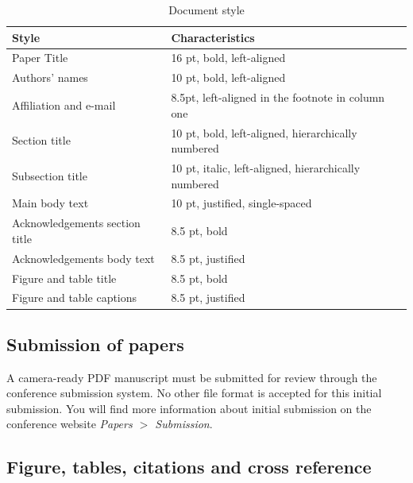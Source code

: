 \documentclass[smallextended,twocolumn]{electrimacs2024}
\begin{document}
\begin{table}[!ht]
	\centering
	\caption{Document style} \label{TAB:sizeandstyle}
	\begin{tabular}{p{1.3in} p{1.3in}} 	\hline\hline
	\textbf{Style}                      & \textbf{Characteristics}         \\ \hline\hline
	Paper Title                         & 16 pt, bold, left-aligned\\ \hline
	Authors' names                      & 10 pt, bold, left-aligned           \\ \hline
	Affiliation and e-mail              & 8.5pt, left-aligned in the footnote in column one\\ \hline
	Section title                       & 10 pt, bold, left-aligned, hierarchically numbered  \\ \hline
	Subsection title                    & 10 pt, italic, left-aligned, hierarchically numbered  \\ \hline
	Main body text                      & 10 pt, justified, single-spaced \\ \hline
	Acknowledgements section title      & 8.5 pt, bold \\ \hline
	Acknowledgements body text          & 8.5 pt, justified \\ \hline
	Figure and table title              & 8.5 pt, bold       \\ \hline
	Figure and table captions           & 8.5 pt, justified \\ \hline\hline
	\end{tabular}
\end{table}

\subsection{Submission of papers}
A camera-ready PDF manuscript must be submitted for review through the conference submission system. No other file format is accepted for this initial submission. You will find more information about initial submission on the conference website \emph{Papers $>$ Submission}.

\subsection{Figure, tables, citations and cross reference}
\end{document}
